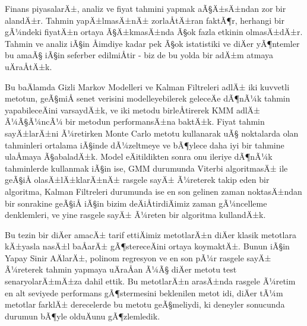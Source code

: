 \begin{ozet}
Finans piyasalarÄ±, analiz ve fiyat tahmini yapmak aÃ§Ä±sÄ±ndan zor bir
alandÄ±r. Tahmin yapÄ±lmasÄ±nÄ± zorlaÅtÄ±ran faktÃ¶r, herhangi bir gÃ¼ndeki fiyatÄ±n
ortaya Ã§Ä±kmasÄ±nda Ã§ok fazla etkinin olmasÄ±dÄ±r. Tahmin ve analiz iÃ§in Åimdiye
kadar pek Ã§ok istatistiki ve diÄer yÃ¶ntemler bu amaÃ§ iÃ§in seferber edilmiÅtir -
biz de bu yolda bir adÄ±m atmaya uÄraÅtÄ±k.

Bu baÄlamda Gizli Markov Modelleri ve Kalman Filtreleri adlÄ± iki kuvvetli
metotun, geÃ§miÅ senet verisini modelleyebilerek geleceÄe dÃ¶nÃ¼k tahmin
yapabileceÄini varsay\-dÄ±k, ve iki metodu birleÅtirerek KMM adlÄ± Ã¼Ã§Ã¼ncÃ¼ bir
metodun performansÄ±na baktÄ±k. Fiyat tahmin sayÄ±larÄ±ni Ã¼retirken Monte Carlo
metotu kullanarak uÃ§ noktalarda olan tahminleri ortalama iÃ§inde dÃ¼zeltmeye ve
bÃ¶ylece daha iyi bir tahmine ulaÅmaya Ã§abaladÄ±k. Model eÄitildikten sonra onu
ileriye dÃ¶nÃ¼k tahminlerde kullanmak iÃ§in ise, GMM durumunda Viterbi algoritmasÄ±
ile geÃ§iÅ olasÄ±lÄ±klarÄ±nÄ± rasgele sayÄ± Ã¼reterek takip eden bir algoritma, Kalman
Filtreleri durumunda ise en son gelinen zaman noktasÄ±ndan bir sonrakine geÃ§iÅ
iÃ§in bizim deÄiÅtirdiÄimiz zaman gÃ¼ncelleme denklemleri, ve yine rasgele sayÄ±
Ã¼reten bir algoritma kullandÄ±k.

Bu tezin bir diÄer amacÄ± tarif ettiÄimiz metotlarÄ±n diÄer klasik metotlara
kÄ±yasla nasÄ±l baÅarÄ± gÃ¶stereceÄini ortaya koymaktÄ±. Bunun iÃ§in Yapay Sinir
AÄlarÄ±, polinom regresyon ve en son pÃ¼r rasgele sayÄ± Ã¼reterek tahmin yapmaya
uÄraÅan Ã¼Ã§ diÄer metotu test senaryolarÄ±mÄ±za dahil ettik. Bu metotlarÄ±n arasÄ±nda
rasgele Ã¼retim en alt seviyede performans gÃ¶stermesini beklenilen metot idi,
diÄer tÃ¼m metotlar farklÄ± derecelerde bu metotu geÃ§meliydi, ki deneyler
sonucunda durumun bÃ¶yle olduÄunu gÃ¶zlemledik.
\end{ozet}

\tableofcontents
\listoffigures
\listoftables

